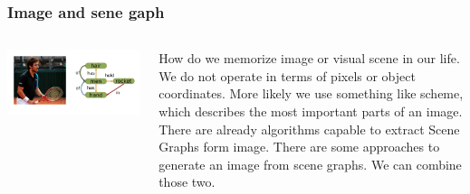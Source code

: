 \documentclass[10pt]{beamer}
\begin{document}
\begin{frame}
    \frametitle{Image and sene gaph}
    \begin{columns}
        \begin{column}{0.5\textwidth}
            \includegraphics[width=\textwidth]{figure/image-and-scene-graph.png}
        \end{column}
        \begin{column}{0.5\textwidth}
            How do we memorize image or visual scene in our life. We do not operate in terms of pixels or object coordinates. More likely we use something like scheme, which describes the most important parts of an image.
            There are already algorithms capable to extract Scene Graphs form image. There are some approaches to generate an image from scene graphs. We can combine those two.
        \end{column}
    \end{columns}
\end{frame}
\end{document}
